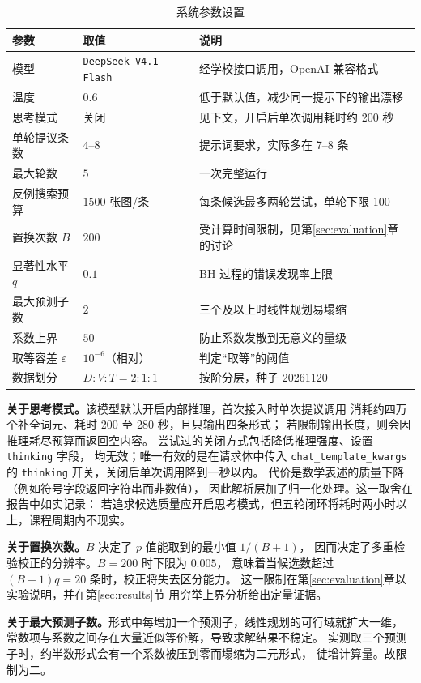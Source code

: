 \begin{table}[H]
\centering
\small
\caption{系统参数设置}
\label{tab:params}
\begin{tabularx}{\linewidth}{@{}>{\raggedright\arraybackslash}p{3.4cm}
                              >{\raggedright\arraybackslash}p{4.05cm}
                              >{\raggedright\arraybackslash}X@{}}
\toprule
参数 & 取值 & 说明 \\
\midrule
模型 & \texttt{DeepSeek-V4.1-Flash} & 经学校接口调用，OpenAI 兼容格式 \\
温度 & $0.6$ & 低于默认值，减少同一提示下的输出漂移 \\
思考模式 & 关闭 & 见下文，开启后单次调用耗时约 200 秒 \\
单轮提议条数 & $4$--$8$ & 提示词要求，实际多在 7--8 条 \\
最大轮数 & $5$ & 一次完整运行 \\
反例搜索预算 & $1500$ 张图/条 & 每条候选最多两轮尝试，单轮下限 100 \\
置换次数 $B$ & $200$ & 受计算时间限制，见第\ref{sec:evaluation}章的讨论 \\
显著性水平 $q$ & $0.1$ & BH 过程的错误发现率上限 \\
最大预测子数 & $2$ & 三个及以上时线性规划易塌缩 \\
系数上界 & $50$ & 防止系数发散到无意义的量级 \\
取等容差 $\varepsilon$ & $10^{-6}$（相对） & 判定“取等”的阈值 \\
数据划分 & $D{:}V{:}T = 2{:}1{:}1$ & 按阶分层，种子 20261120 \\
\bottomrule
\end{tabularx}
\end{table}

\textbf{关于思考模式。}该模型默认开启内部推理，首次接入时单次提议调用
消耗约四万个补全词元、耗时 200 至 280 秒，且只输出四条形式；
若限制输出长度，则会因推理耗尽预算而返回空内容。
尝试过的关闭方式包括降低推理强度、设置 \texttt{thinking} 字段，
均无效；唯一有效的是在请求体中传入 \texttt{chat\_template\_kwargs}
的 \texttt{thinking} 开关，关闭后单次调用降到一秒以内。
代价是数学表述的质量下降（例如符号字段返回字符串而非数值），
因此解析层加了归一化处理。这一取舍在报告中如实记录：
若追求候选质量应开启思考模式，但五轮闭环将耗时两小时以上，课程周期内不现实。

\textbf{关于置换次数。}$B$ 决定了 $p$ 值能取到的最小值 $1/(B+1)$，
因而决定了多重检验校正的分辨率。$B = 200$ 时下限为 $0.005$，
意味着当候选数超过 $(B+1)q = 20$ 条时，校正将失去区分能力。
这一限制在第\ref{sec:evaluation}章以实验说明，并在第\ref{sec:results}节
用穷举上界分析给出定量证据。

\textbf{关于最大预测子数。}形式中每增加一个预测子，线性规划的可行域就扩大一维，
常数项与系数之间存在大量近似等价解，导致求解结果不稳定。
实测取三个预测子时，约半数形式会有一个系数被压到零而塌缩为二元形式，
徒增计算量。故限制为二。

